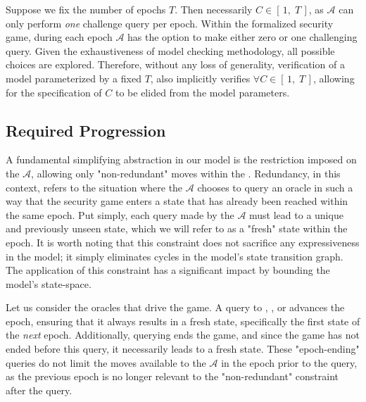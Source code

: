 \documentclass[runningheads]{llncs}
\newcommand{\Adversary}{\ensuremath{\mathcal{A}}\xspace}
\newcommand{\NumericRange}[2]{\ensuremath{\left[\,#1,\; #2\,\right]}\xspace}
\begin{document}
Suppose we fix the number of epochs $T$.
Then necessarily $C \in \NumericRange{1}{T}$, as \Adversary can only perform \emph{one} challenge query per epoch.
Within the formalized security game, during each epoch \Adversary has the option to make either zero or one challenging query.
Given the exhaustiveness of model checking methodology, all possible choices are explored.
Therefore, without any loss of generality, verification of a model parameterized by a fixed $T$, also implicitly verifies $\forall C \in \NumericRange{1}{T}$, allowing for the specification of $C$ to be elided from the model parameters.




\subsection{Required Progression\label{sec:abstraction-progression}}

A fundamental simplifying abstraction in our model is the restriction imposed on the \Adversary, allowing only "non-redundant" moves within the \CGKAsec. Redundancy, in this context, refers to the situation where the \Adversary chooses to query an oracle in such a way that the security game enters a state that has already been reached within the same epoch. Put simply, each query made by the \Adversary must lead to a unique and previously unseen state, which we will refer to as a "fresh" state within the epoch. It is worth noting that this constraint does not sacrifice any expressiveness in the model; it simply eliminates cycles in the model's state transition graph. The application of this constraint has a significant impact by bounding the model's state-space.

Let us consider the oracles that drive the game. A query to , , or  advances the epoch, ensuring that it always results in a fresh state, specifically the first state of the \emph{next} epoch. Additionally, querying  ends the game, and since the game has not ended before this query, it necessarily leads to a fresh state. These "epoch-ending" queries do not limit the moves available to the \Adversary in the epoch prior to the query, as the previous epoch is no longer relevant to the "non-redundant" constraint after the query.
\end{document}
